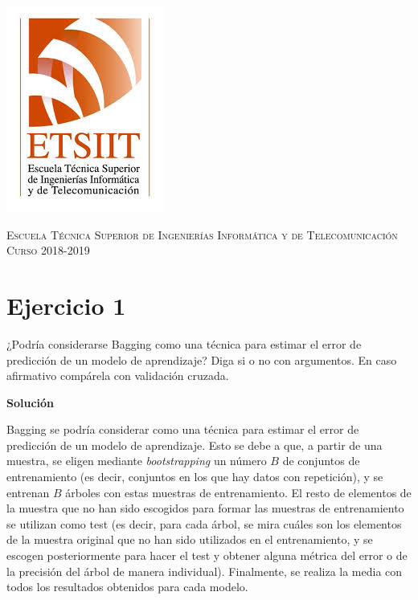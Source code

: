 \documentclass[11pt,a4paper]{article}
\newcommand{\answer}{\noindent\textbf{Solución}}
\newcommand{\addtoc}[1]{\addcontentsline{toc}{section}{#1}}
\begin{document}
\begin{titlepage}
\begin{minipage}{\textwidth}
\includegraphics[scale=0.3]{img/etsiit.jpeg}

\vspace{0.7cm}
\textsc{Escuela Técnica Superior de Ingenierías Informática y de Telecomunicación}\\
\vspace{1cm}
\textsc{Curso 2018-2019}
\end{minipage}
\end{titlepage}

\tableofcontents
\thispagestyle{empty}				%

\newpage

\setlength{\parskip}{1em}

\section*{Ejercicio 1}
\addtoc{Ejercicio 1}

\noindent ¿Podría considerarse Bagging como una técnica para estimar el error de predicción de un
modelo de aprendizaje? Diga si o no con argumentos. En caso afirmativo compárela con
validación cruzada.

\answer

Bagging se podría considerar como una técnica para estimar el error de predicción de un modelo de aprendizaje.
Esto se debe a que, a partir de una muestra, se eligen mediante \textit{bootstrapping} un número $B$ de conjuntos de entrenamiento
(es decir, conjuntos en los que hay datos con repetición), y se entrenan $B$ árboles con estas muestras de entrenamiento. El resto
de elementos de la muestra que no han sido escogidos para formar las muestras de entrenamiento se utilizan como test (es decir, para
cada árbol, se mira cuáles son los elementos de la muestra original que no han sido utilizados en el entrenamiento, y se escogen
posteriormente para hacer el test y obtener alguna métrica del error o de la precisión del árbol de manera individual). Finalmente,
se realiza la media con todos los resultados obtenidos para cada modelo.
\end{document}
